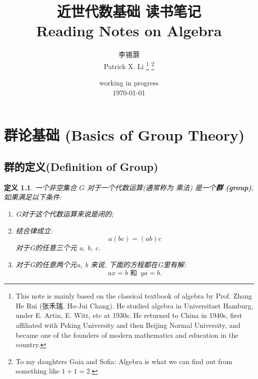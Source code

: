 \documentclass[utf8]{ctexbook}
\newtheorem{definition}{定义}[section]
\begin{document}
\title{近世代数基础 读书笔记 \\Reading Notes on Algebra}
\author{李锡灏\\Patrick X. Li \thanks{This note is mainly based on the classical textbook of algebra by Prof. Zhang He Rui (张禾瑞, Ho-Jui Chang). He studied algebra in Universitaet Hamburg, under E. Artin, E. Witt, etc at 1930s. He returned to China in 1940s, first affiliated with Peking University and then Beijing Normal University, and became one of the founders of modern mathematics and education in the country.}  \thanks{To my daughters Gaia and Sofia: Algebra is what we can find out from something like $1+1=2$.}}



\date{working in progress\\ \today}
\maketitle



\newpage
\tableofcontents

\newpage

\chapter{群论基础 (Basics of Group Theory)}

\section{群的定义(Definition of Group)}

\begin{definition}\label{def_group_1}
一个非空集合 $G$ 对于一个代数运算(通常称为 乘法) 是一个\textbf{群 (group)}, 如果满足以下条件:
\begin{enumerate}
\item[I.]{G对于这个代数运算来说是闭的;}
\item[II.]{结合律成立:
	\begin{equation}
		a(bc) = (ab) c 	
	\end{equation}
对于G的任意三个元 a, b, c.}

\item[III.]{对于G的任意两个元a, b 来说, 下面的方程都在G里有解:
\begin{equation}
ax = b \mbox{ 和 } \, y a = b.
\end{equation}
}
\end{enumerate}
\end{definition}
\end{document}

